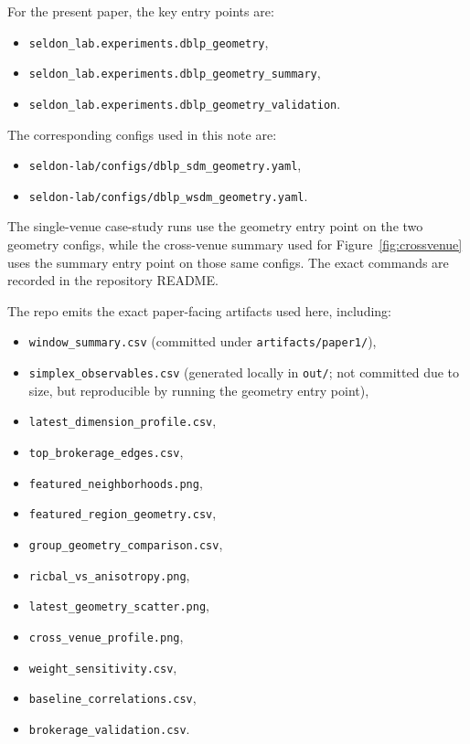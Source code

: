 \documentclass[11pt]{article}
\begin{document}
For the present paper, the key entry points are:
\begin{itemize}
    \item \texttt{seldon\_lab.experiments.dblp\_geometry},
    \item \texttt{seldon\_lab.experiments.dblp\_geometry\_summary},
    \item \texttt{seldon\_lab.experiments.dblp\_geometry\_validation}.
\end{itemize}
The corresponding configs used in this note are:
\begin{itemize}
    \item \texttt{seldon-lab/configs/dblp\_sdm\_geometry.yaml},
    \item \texttt{seldon-lab/configs/dblp\_wsdm\_geometry.yaml}.
\end{itemize}

The single-venue case-study runs use the geometry entry point on the two geometry
configs, while the cross-venue summary used for Figure~\ref{fig:crossvenue}
uses the summary entry point on those same configs. The exact commands are
recorded in the repository README.

The repo emits the exact paper-facing artifacts used here, including:
\begin{itemize}
    \item \texttt{window\_summary.csv} (committed under \texttt{artifacts/paper1/}),
    \item \texttt{simplex\_observables.csv} (generated locally in \texttt{out/}; not committed due to size, but reproducible by running the geometry entry point),
    \item \texttt{latest\_dimension\_profile.csv},
    \item \texttt{top\_brokerage\_edges.csv},
    \item \texttt{featured\_neighborhoods.png},
    \item \texttt{featured\_region\_geometry.csv},
    \item \texttt{group\_geometry\_comparison.csv},
    \item \texttt{ricbal\_vs\_anisotropy.png},
    \item \texttt{latest\_geometry\_scatter.png},
    \item \texttt{cross\_venue\_profile.png},
    \item \texttt{weight\_sensitivity.csv},
    \item \texttt{baseline\_correlations.csv},
    \item \texttt{brokerage\_validation.csv}.
\end{itemize}
\end{document}
